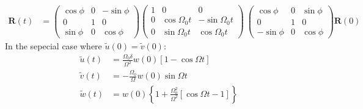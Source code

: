 \begin{align*}
	\bm{R}(t) &= \begin{pmatrix}
			\cos\phi & 0 & -\sin\phi \\
			0 & 1 & 0 \\
			\sin\phi & 0 & \cos\phi
		     \end{pmatrix}
		     \begin{pmatrix}
		1 &0 &0 \\
		0 & \cos\Omega_0 t & -\sin\Omega_0 t \\
		0 & \sin\Omega_0t & \cos\Omega_0 t
		\end{pmatrix}\
		\begin{pmatrix}
			\cos\phi & 0 & \sin\phi \\
			0 & 1 & 0 \\
			-\sin\phi & 0 & \cos\phi
		\end{pmatrix} \bm{R}(0)
\end{align*}
In the sepecial case where $\tilde{u}(0) = \tilde{v}(0)$:
\begin{align*}
	\tilde{u} (t) &= \frac{\Omega_0\delta}{\Omega^2}w(0)\left[1-\cos\Omega t\right] \\
	\tilde{v} (t) &= -\frac{\Omega_0}{\Omega}w(0)\sin\Omega t \\
	\tilde{w} (t) &= w(0)\left\{1 + \frac{\Omega_0^2}{\Omega^2} \left[\cos\Omega t -1\right]\right\}
\end{align*}
